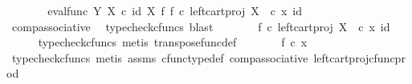 \begin{isabellebody}
\ \ \isamarkupfalse%
\ \isamarkupfalse%
\ {\isachardoublequoteopen}{\isachardot}{\kern0pt}{\isachardot}{\kern0pt}{\isachardot}{\kern0pt}\ {\isacharequal}{\kern0pt}\ {\isacharparenleft}{\kern0pt}eval{\isacharunderscore}{\kern0pt}func\ Y\ X\ {\isasymcirc}\isactrlsub c\ {\isacharparenleft}{\kern0pt}id\ X\ {\isasymtimes}\isactrlsub f\ {\isacharparenleft}{\kern0pt}f\ {\isasymcirc}\isactrlsub c\ {\isacharparenleft}{\kern0pt}left{\isacharunderscore}{\kern0pt}cart{\isacharunderscore}{\kern0pt}proj\ X\ {\isasymone}{\isacharparenright}{\kern0pt}{\isacharparenright}{\kern0pt}\isactrlsup {\isasymsharp}{\isacharparenright}{\kern0pt}{\isacharparenright}{\kern0pt}\ {\isasymcirc}\isactrlsub c\ {\isasymlangle}x{\isacharcomma}{\kern0pt}\ id\ {\isasymone}{\isasymrangle}{\isachardoublequoteclose}\isanewline
\ \ \ \ \isamarkupfalse%
\ comp{\isacharunderscore}{\kern0pt}associative{}\ \isamarkupfalse%
\ {\isacharparenleft}{\kern0pt}typecheck{\isacharunderscore}{\kern0pt}cfuncs{\isacharcomma}{\kern0pt}\ blast{\isacharparenright}{\kern0pt}\isanewline
\ \ \isamarkupfalse%
\ \isamarkupfalse%
\ {\isachardoublequoteopen}{\isachardot}{\kern0pt}{\isachardot}{\kern0pt}{\isachardot}{\kern0pt}\ {\isacharequal}{\kern0pt}\ {\isacharparenleft}{\kern0pt}f\ {\isasymcirc}\isactrlsub c\ {\isacharparenleft}{\kern0pt}left{\isacharunderscore}{\kern0pt}cart{\isacharunderscore}{\kern0pt}proj\ X\ {\isasymone}{\isacharparenright}{\kern0pt}{\isacharparenright}{\kern0pt}\ {\isasymcirc}\isactrlsub c\ {\isasymlangle}x{\isacharcomma}{\kern0pt}\ id\ {\isasymone}{\isasymrangle}{\isachardoublequoteclose}\isanewline
\ \ \ \ \isamarkupfalse%
\ {\isacharparenleft}{\kern0pt}typecheck{\isacharunderscore}{\kern0pt}cfuncs{\isacharcomma}{\kern0pt}\ metis\ transpose{\isacharunderscore}{\kern0pt}func{\isacharunderscore}{\kern0pt}def{\isacharparenright}{\kern0pt}\isanewline
\ \ \isamarkupfalse%
\ \isamarkupfalse%
\ {\isachardoublequoteopen}{\isachardot}{\kern0pt}{\isachardot}{\kern0pt}{\isachardot}{\kern0pt}\ {\isacharequal}{\kern0pt}\ f\ {\isasymcirc}\isactrlsub c\ x{\isachardoublequoteclose}\isanewline
\ \ \ \ \isamarkupfalse%
\ {\isacharparenleft}{\kern0pt}typecheck{\isacharunderscore}{\kern0pt}cfuncs{\isacharcomma}{\kern0pt}\ metis\ assms\ cfunc{\isacharunderscore}{\kern0pt}type{\isacharunderscore}{\kern0pt}def\ comp{\isacharunderscore}{\kern0pt}associative\ left{\isacharunderscore}{\kern0pt}cart{\isacharunderscore}{\kern0pt}proj{\isacharunderscore}{\kern0pt}cfunc{\isacharunderscore}{\kern0pt}prod{\isacharparenright}{\kern0pt}\isanewline

\end{isabellebody}
